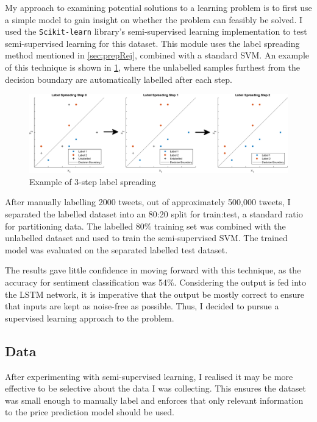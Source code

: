 \documentclass[12pt,a4paper,twoside,openright]{report}
\begin{document}
My approach to examining potential solutions to a learning problem is to first
use a simple model to gain insight on whether the problem can feasibly
be solved. I used the \texttt{Scikit-learn} library's semi-supervised learning 
implementation to test semi-supervised learning
for this dataset. This module uses the label spreading method mentioned in
\cref{sec:prepRej}, combined with a standard SVM. An example of this technique is shown in \cref{fig:ls},
where the unlabelled samples furthest from the decision boundary are automatically labelled after each step.

\begin{figure}[H]
\centering
\vspace{10pt}
\includegraphics[width=\textwidth]{LabelSpreading.png}
\caption{Example of 3-step label spreading}
\label{fig:ls}
\end{figure}

After manually labelling 2000 tweets, out of
approximately 500,000 tweets, I separated the labelled dataset into an 80:20 split for train:test,
a standard ratio for partitioning data. The labelled 80\% training set was combined
with the unlabelled dataset and used to train the semi-supervised SVM. The
trained model was evaluated on the separated labelled test dataset.

The results gave little confidence in moving forward with this technique, as the accuracy 
for sentiment classification was 54\%. Considering the output is
fed into the LSTM network, it is imperative that the output be mostly correct
to ensure that inputs are kept as noise-free as possible. Thus, I decided to
pursue a supervised learning approach to the problem.

\subsection{Data}
\label{sec:impSentiData}

After experimenting with semi-supervised learning, I realised
it may be more effective to be selective about the data I was collecting. This ensures
the dataset was small enough to manually label and enforces that only relevant 
information to the price prediction model should be used.
\end{document}
